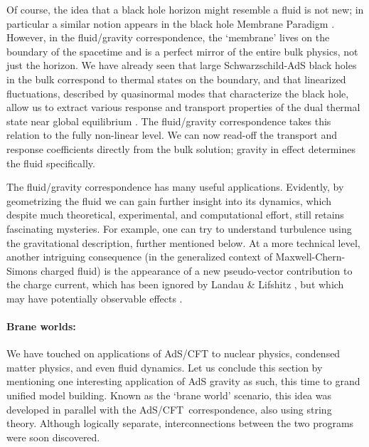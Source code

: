 \documentclass[12pt,a4paper]{article}
\def\AC{AdS/CFT}
\def\schw{Schwarzschild}
\begin{document}
Of course, the idea that a black hole horizon might resemble a fluid is not new; in particular a similar notion appears in the black hole Membrane Paradigm \cite{Price:1986yy,Damour:1978cg}.  However, in the fluid/gravity correspondence, the `membrane' lives on the boundary of the spacetime and is a perfect mirror of the entire bulk physics, not just the horizon.  
We have already seen that large \schw-AdS black holes in the bulk correspond to thermal states on the boundary, and that linearized fluctuations, described by quasinormal modes that characterize the black hole, allow us to extract various response and transport properties of the dual thermal state near global equilibrium \cite{Policastro:2001yc}.  The fluid/gravity correspondence \cite{Bhattacharyya:2008jc} takes this relation to the fully non-linear level.  We can now read-off the transport and response coefficients directly from the bulk solution; gravity in effect determines the fluid specifically.  


The fluid/gravity correspondence has many useful applications.  Evidently, by geometrizing the fluid we can gain further insight into its dynamics, which despite much theoretical, experimental, and computational effort, still retains fascinating mysteries.  For example, one can try to understand turbulence using the gravitational description, further mentioned below.
At a more technical level, another intriguing consequence (in the generalized context of Maxwell-Chern-Simons charged fluid) is the appearance of a new pseudo-vector contribution to the charge current, which has been ignored by 
Landau \& Lifshitz \cite{Landau:1965uq}, but which may have potentially observable effects \cite{Son:2009tf}.  

\paragraph{Brane worlds:}  %
We have touched on applications of AdS/CFT to nuclear physics, condensed matter physics, and even fluid dynamics.   Let us conclude this section by mentioning one interesting  application of AdS gravity as such, this time to grand unified model building.  Known as the `brane world' scenario, this idea was developed in parallel with the \AC\ correspondence, also using string theory.  Although logically separate,  interconnections between the two programs were soon discovered.
\end{document}
